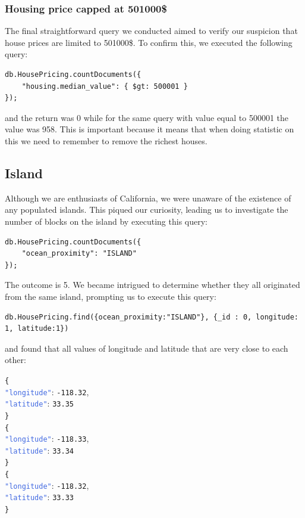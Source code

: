 \documentclass{Configuration_Files/PoliMi3i_thesis}
\newcommand{\jsonkey}[1]{\textcolor{RoyalBlue}{\texttt{"#1"}}}
\newcommand{\jsonnumber}[1]{\textcolor{BrickRed}{\texttt{#1}}}
\begin{document}
\subsubsection*{Housing price capped at 501000\$}
The final straightforward query we conducted aimed to verify our suspicion that house prices are limited to 501000\$. To confirm this, we executed the following query:
\begin{lstlisting}[language=MongoDB]
db.HousePricing.countDocuments({
    "housing.median_value": { $gt: 500001 }
});
\end{lstlisting}
and the return was 0 while for the same query with value equal to 500001 the value was 958. This is important because it means that when doing statistic on this we need to remember to remove the richest houses. 

\subsection{Island}
Although we are enthusiasts of California, we were unaware of the existence of any populated islands. This piqued our curiosity, leading us to investigate the number of blocks on the island by executing this query:
\begin{lstlisting}[language=MongoDB]
db.HousePricing.countDocuments({
    "ocean_proximity": "ISLAND"
});
\end{lstlisting}
The outcome is 5. 
We became intrigued to determine whether they all originated from the same island, prompting us to execute this query:
\begin{lstlisting}[language=MongoDB]
db.HousePricing.find({ocean_proximity:"ISLAND"}, {_id : 0, longitude: 1, latitude:1})
\end{lstlisting}
and found that all values of longitude and latitude that are very close to each other: 

\noindent
\texttt{\{} \\
\jsonkey{longitude}: \jsonnumber{-118.32}, \\
\jsonkey{latitude}: \jsonnumber{33.35} \\
\texttt{\}} \\


\noindent
\texttt{\{} \\
\jsonkey{longitude}: \jsonnumber{-118.33}, \\
\jsonkey{latitude}: \jsonnumber{33.34} \\
\texttt{\}} \\


\noindent
\texttt{\{} \\
\jsonkey{longitude}: \jsonnumber{-118.32}, \\
\jsonkey{latitude}: \jsonnumber{33.33} \\
\texttt{\}} \\
\end{document}
